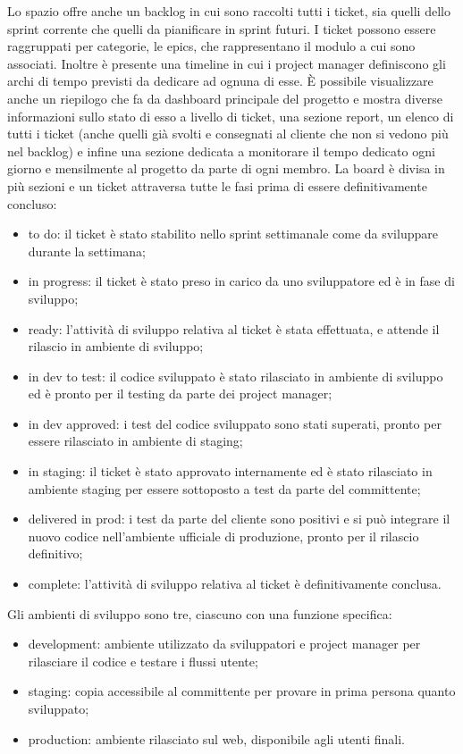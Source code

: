 \documentclass[target=bach,aauheader=,style=]{thud}
\begin{document}
Lo spazio offre anche un backlog in cui sono raccolti tutti i ticket, sia quelli dello sprint corrente che quelli da pianificare in sprint futuri.
I ticket possono essere raggruppati per categorie, le epics, che rappresentano il modulo a cui sono associati. Inoltre è presente una timeline in cui i project manager definiscono gli archi di
tempo previsti da dedicare ad ognuna di esse. È possibile visualizzare anche un riepilogo che fa da dashboard principale del progetto e mostra diverse informazioni sullo stato di esso a livello
di ticket, una sezione report, un elenco di tutti i ticket (anche quelli già svolti e consegnati al cliente che non si vedono più nel backlog) e infine una sezione dedicata a monitorare il tempo
dedicato ogni giorno e mensilmente al progetto da parte di ogni membro.
La board è divisa in più sezioni e un ticket attraversa tutte le fasi prima di essere definitivamente concluso:
\begin{itemize}
    \item to do: il ticket è stato stabilito nello sprint settimanale come da sviluppare durante la settimana;
    \item in progress: il ticket è stato preso in carico da uno sviluppatore ed è in fase di sviluppo;
    \item ready: l'attività di sviluppo relativa al ticket è stata effettuata, e attende il rilascio in ambiente di sviluppo;
    \item in dev to test: il codice sviluppato è stato rilasciato in ambiente di sviluppo ed è pronto per il testing da parte dei project manager;
    \item in dev approved: i test del codice sviluppato sono stati superati, pronto per essere rilasciato in ambiente di staging;
    \item in staging: il ticket è stato approvato internamente ed è stato rilasciato in ambiente staging per essere sottoposto a test da parte del committente;
    \item delivered in prod: i test da parte del cliente sono positivi e si può integrare il nuovo codice nell'ambiente ufficiale di produzione, pronto per il rilascio definitivo;
    \item complete: l'attività di sviluppo relativa al ticket è definitivamente conclusa.
\end{itemize}

Gli ambienti di sviluppo sono tre, ciascuno con una funzione specifica: 
\begin{itemize}
    \item development: ambiente utilizzato da sviluppatori e project manager per rilasciare il codice e testare i flussi utente;
    \item staging: copia accessibile al committente per provare in prima persona quanto sviluppato;
    \item production: ambiente rilasciato sul web, disponibile agli utenti finali.
\end{itemize}
\end{document}
